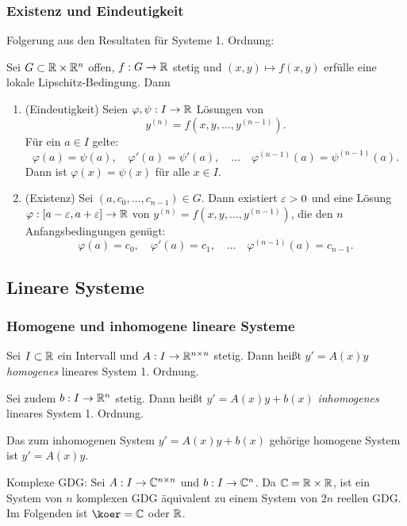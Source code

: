 \subsubsection{Existenz und Eindeutigkeit}
Folgerung aus den Resultaten für Systeme 1. Ordnung:

\clearpage

\begin{kor}
  Sei $G \subset \mathbb{R} \times \mathbb{R}^n$ offen, $f:G \to \mathbb{R}$ stetig und $(x,y)
  \mapsto f(x,y)$ erfülle eine lokale Lipschitz-Bedingung. Dann
  \begin{enumerate}
  \item (Eindeutigkeit) Seien $\varphi, \psi: I \to \mathbb{R}$ Lösungen von
    \[ y^{(n)} = f(x,y,\ldots,y^{(n-1)}).\]
    Für ein $a \in I$ gelte:
    \[ \varphi(a) = \psi(a), \quad \varphi'(a) = \psi'(a), \quad \ldots \quad
      \varphi^{(n-1)}(a) = \psi^{(n-1)}(a). \]
    Dann ist $\varphi(x) =  \psi(x)$ für alle $x \in I$.
  \item (Existenz) Sei $(a,c_0, \ldots, c_{n-1}) \in G$. Dann existiert $\varepsilon >
    0$ und eine Lösung $\varphi:[a-\varepsilon, a+\varepsilon] \to \mathbb{R}$ von $y^{(n)} =
    f(x,y, \ldots, y^{(n-1)})$, die den $n$ Anfangsbedingungen genügt:
    \[ \varphi(a) = c_0, \quad \varphi'(a) = c_1, \quad \ldots \quad
      \varphi^{(n-1)}(a) = c_{n-1}.\]
  \end{enumerate}
\end{kor}

\subsection{Lineare Systeme}
\subsubsection{Homogene und inhomogene lineare Systeme}
Sei $I \subset \mathbb{R}$ ein Intervall und $A:I \to \mathbb{R}^{n \times n}$ stetig.
Dann heißt $y' = A(x) y$ \emph{homogenes} lineares System 1. Ordnung.

Sei zudem $b: I \to \mathbb{R}^n$ stetig. Dann heißt $y' = A(x)y + b(x)$
\emph{inhomogenes} lineares System 1. Ordnung.

Das zum inhomogenen System $y' = A(x)y + b(x)$ gehörige homogene System ist $y'
= A(x) y$.

Komplexe GDG: Sei $A:I \to \mathbb{C}^{n \times n}$ und $b:I \to \mathbb{C}^n$. Da
$\mathbb{C} = \mathbb{R} \times \mathbb{R}$, ist ein System von $n$ komplexen GDG äquivalent
zu einem System von $2n$ reellen GDG. Im Folgenden ist $\koer = \complex$ oder
$\mathbb{R}$.

